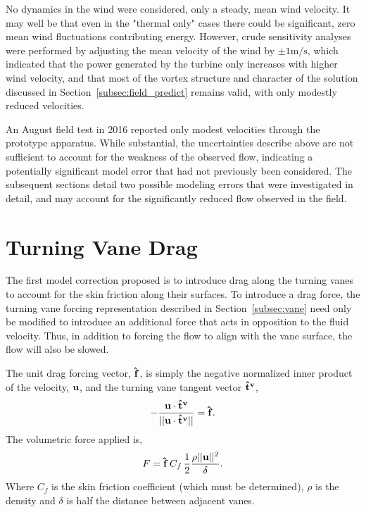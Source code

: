 


No dynamics in the wind were considered, only a steady, mean wind
velocity. It may well be that even in the "thermal only" cases there
could be significant, zero mean wind fluctuations contributing energy. 
However, crude sensitivity analyses were performed by
adjusting the mean velocity of the wind by  $\pm 1 \text{m}/\text{s}$,
which indicated that the power generated by the turbine only increases
with higher wind velocity, and that most of the vortex structure and
character of the solution discussed in
Section~\ref{subsec:field_predict} remains valid, with only modestly
reduced velocities. 


An August field test in 2016 reported only modest velocities through the 
prototype apparatus.
While substantial, the uncertainties describe above are not sufficient
to account for the weakness of the observed flow, indicating a
potentially significant model error that had not previously been
considered. The subsequent sections detail two possible modeling
errors that were investigated in detail, and may account
for the significantly reduced flow observed in the field. 

\section{Turning Vane Drag}
\label{sec:vane_drag}

The first model correction proposed is to introduce drag along the
turning vanes to account for the skin friction along their surfaces. To
introduce a drag force, the turning vane forcing 
representation described in Section~\ref{subsec:vane} need only be
modified to introduce an additional force that acts in opposition to the
fluid velocity. Thus, in addition to forcing the flow to align with the
vane surface, the flow will also be slowed. 

The unit drag forcing vector, ${\bf \hat f}$, is simply the negative
normalized inner product of the velocity, ${\bf u}$, and the turning
vane tangent vector ${\bf \hat t^v}$,  
\begin{equation}
- \frac{{\bf u} \cdot {\bf \hat t^v}}{|| {\bf u} \cdot {\bf \hat t^v}
 ||} = {\bf \hat f}.  
\end{equation}
The volumetric force applied is, 
\begin{equation}
 F = {\bf \hat f} \, C_f \, \frac{1}{2} \frac{\rho || {\bf u} ||^2}{\delta}.
\end{equation}
Where $C_f$ is the skin friction coefficient (which must be determined),
$\rho $ is the density and $\delta$ is half the distance between
adjacent vanes. 


